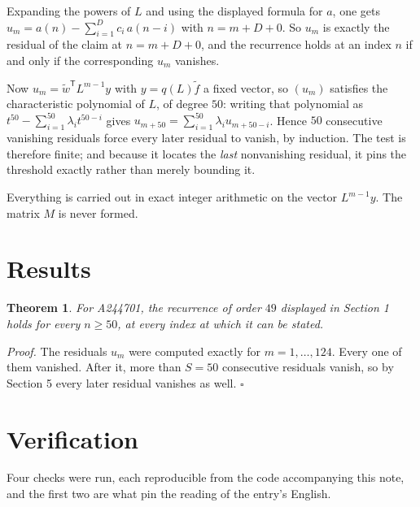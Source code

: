 \documentclass[11pt]{article}
\newtheorem{theorem}{Theorem}
\theoremstyle{definition}
\begin{document}
Expanding the powers of $L$ and using the displayed formula for $a$, one gets $u_m = a(n) - \sum_{i=1}^{D} c_i\,a(n-i)$ with $n = m + D + 0$. So $u_m$ is exactly the residual of the claim at $n = m + D + 0$, and the recurrence holds at an index $n$ if and only if the corresponding $u_m$ vanishes.

Now $u_m = \tilde w^{\mathsf T} L^{m-1} y$ with $y = q(L)\tilde f$ a fixed vector, so $(u_m)$ satisfies the characteristic polynomial of $L$, of degree $50$: writing that polynomial as $t^{50} - \sum_{i=1}^{50} \lambda_i t^{50-i}$ gives $u_{m+50} = \sum_{i=1}^{50} \lambda_i u_{m+50-i}$. Hence $50$ consecutive vanishing residuals force every later residual to vanish, by induction. The test is therefore finite; and because it locates the {\itshape last} nonvanishing residual, it pins the threshold exactly rather than merely bounding it.

Everything is carried out in exact integer arithmetic on the vector $L^{m-1}y$. The matrix $M$ is never formed.

\section{Results}

\begin{theorem} For A244701, the recurrence of order $49$ displayed in Section 1 holds for every $n \ge 50$, at every index at which it can be stated.\end{theorem}

{\itshape Proof.} The residuals $u_m$ were computed exactly for $m = 1,\dots,124$. Every one of them vanished. After it, more than $S = 50$ consecutive residuals vanish, so by Section 5 every later residual vanishes as well. $\square$

\section{Verification}

Four checks were run, each reproducible from the code accompanying this note, and the first two are what pin the reading of the entry's English.
\end{document}
